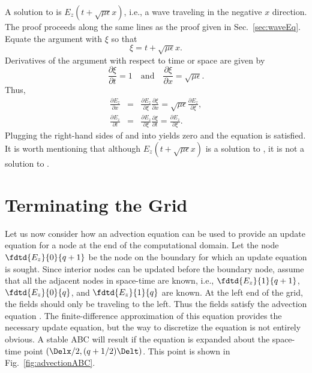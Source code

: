 A solution to  is
$E_z(t+\sqrt{\mu\epsilon}x)$, i.e., a wave traveling in the negative
$x$ direction.  The proof proceeds along the same lines
as the proof given in Sec.\ \ref{sec:waveEq}.  Equate the argument
with $\xi$ so that
\begin{equation}
  \xi = t+\sqrt{\mu\epsilon}x.
\end{equation}
Derivatives of the argument with respect to time or space are given by
\begin{equation}
  \frac{\partial\xi}{\partial t}=1  \quad \mbox{and} \quad
  \frac{\partial\xi}{\partial x}=\sqrt{\mu\epsilon}.
\end{equation}
Thus,
\begin{eqnarray}
 \frac{\partial E_z}{\partial x} \!&=&\!
    \frac{\partial E_z}{\partial \xi}\frac{\partial \xi}{\partial x} = 
    \sqrt{\mu\epsilon}\frac{\partial E_z}{\partial \xi}, 
 \label{eq:advecProof}
  \\
 \frac{\partial E_z}{\partial t} \!&=&\!
    \frac{\partial E_z}{\partial \xi}\frac{\partial \xi}{\partial t} = 
    \frac{\partial E_z}{\partial \xi}.
 \label{eq:advecProofI}
\end{eqnarray}
Plugging the right-hand sides of  and
 into  yields zero and the
equation is satisfied.  It is worth mentioning that although
$E_z(t+\sqrt{\mu\epsilon}x)$ is a solution to 
, it is not a solution to .

\section{Terminating the Grid}

Let us now consider how an advection equation can be used to provide
an update equation for a node at the end of the computational domain.
Let the node $\fdtd{E_z}{0}{q+1}$ be the node on the boundary for
which an update equation is sought.  Since interior nodes can be
updated before the boundary node, assume that all the adjacent nodes
in space-time are known, i.e., $\fdtd{E_z}{1}{q+1}$,
$\fdtd{E_z}{0}{q}$, and $\fdtd{E_z}{1}{q}$ are known.  At the left end
of the grid, the fields should only be traveling to the left.  Thus
the fields satisfy the advection equation .  The
finite-difference approximation of this equation provides the
necessary update equation, but the way to discretize the equation is
not entirely obvious.  A stable ABC will result if the equation is
expanded about the space-time point $(\Delx/2,(q+1/2)\Delt)$.  This
point is shown in Fig.\ \ref{fig:advectionABC}.


